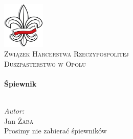 \begin{titlepage}
	\begin{center}

	\includegraphics[width=0.15\textwidth]{./files/lilijka}
	\\[1cm]
	
	\textsc{\LARGE Związek Harcerstwa Rzeczypospolitej}\\[1.0cm]
	\textsc{\Large Duszpasterstwo w Opolu}\\[1.0cm]
	
	\HRule \\[0.4cm]
	{\huge \bfseries Śpiewnik \\[0.4cm] }
	\HRule \\[1.5cm]
	
	
	\vfill
	
	
	\noindent
	
	\large
	\emph{Autor:}\\
	Jan \textsc{Żaba}\\
	
	{\footnotesize Prosimy nie zabierać śpiewników} \\ 
	
	
	
	\end{center}
\end{titlepage}